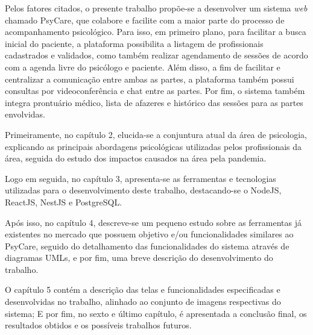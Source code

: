 Pelos fatores citados, o presente trabalho propõe-se a desenvolver um sistema \textit{web} chamado PsyCare, que colabore e facilite com a maior parte do processo de acompanhamento psicológico. Para isso, em primeiro plano, para facilitar a busca inicial do paciente, a plataforma possibilita a listagem de profissionais cadastrados e validados, como também realizar agendamento de sessões de acordo com a agenda livre do psicólogo e paciente. Além disso, a fim de facilitar e centralizar a comunicação entre ambas as partes, a plataforma também possui consultas por videoconferência e chat entre as partes. Por fim, o sistema também integra prontuário médico, lista de afazeres e histórico das sessões para as partes envolvidas.

Primeiramente, no capítulo 2, elucida-se a conjuntura atual da área de psicologia, explicando as principais abordagens psicológicas utilizadas pelos profissionais da área, seguida do estudo dos impactos causados na área pela pandemia.

Logo em seguida, no capítulo 3, apresenta-se as ferramentas e tecnologias utilizadas para o desenvolvimento deste trabalho, destacando-se o NodeJS, ReactJS, NestJS e PostgreSQL.

Após isso, no capítulo 4, descreve-se um pequeno estudo sobre as ferramentas já existentes no mercado que possuem objetivo e/ou funcionalidades similares ao PsyCare, seguido do detalhamento das funcionalidades do sistema através de diagramas UMLs, e por fim, uma breve descrição do desenvolvimento do trabalho.

O capítulo 5 contém a descrição das telas e funcionalidades especificadas e desenvolvidas no trabalho, alinhado ao conjunto de imagens respectivas do sistema; E por fim, no sexto e último capítulo, é apresentada a conclusão final, os resultados obtidos e os possíveis trabalhos futuros.
